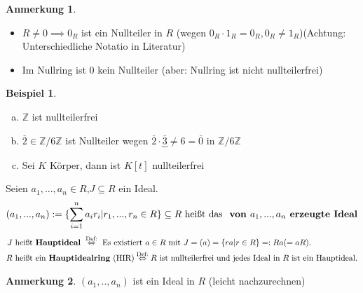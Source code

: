 \documentclass[a4paper, titlepage]{article}
\theoremstyle{definition}
\newtheorem{bsp}[satz]{Beispiel}
\newtheorem*{anm}{Anmerkung}
\newcommand{\Z}{\mathbb{Z}}
\begin{document}
\begin{anm}
\begin{itemize}
	\item $R\neq 0 \implies 0_R$ ist ein Nullteiler in $R$ (wegen $0_R\cdot 1_R=0_R, 0_R\neq 1_R$)(Achtung: Unterschiedliche Notatio in Literatur)
	\item Im Nullring ist $0$ kein Nullteiler (aber: Nullring ist nicht nullteilerfrei)
\end{itemize}
\end{anm}
\begin{bsp}
	\begin{enumerate}[(a)]
		\item $\Z$ ist nullteilerfrei
		\item $\overline{2}\in \Z/6\Z$ ist Nullteiler wegen $\overline{2}\cdot \underbrace{\overline{3}}{\neq 6}= \overline{0}$ in $\Z/6\Z$
		\item Sei $K$ Körper, dann ist $K[t]$ nullteilerfrei
	\end{enumerate}
\end{bsp}
\begin{definition}
Seien $a_1,...,a_n\in R$,$J\subseteq R$ ein Ideal. 
$$	(a_1,...,a_n):=\{\sum_{i=1}^{n}a_ir_i|r_1,...,r_n\in R\} \subseteq R \text{ heißt das \textbf{ von $a_1,...,a_n$ erzeugte Ideal}}$$
\begin{align*}
J& \text{ heißt \textbf{Hauptideal} }\overset{\text{Def:}}{\Leftrightarrow}\text{ Es existiert } a\in R \text{ mit } J=(a)=\{ra|r\in R\} =: Ra (=aR).\\
R&\text{ heißt ein \textbf{Hauptidealring} (HIR)}\overset{\text{Def:}}{\Leftrightarrow}R\text{ ist nullteilerfrei und jedes Ideal in } R \text{ ist ein Hauptideal.}
\end{align*}
\end{definition}
\begin{anm}
 $(a_1,..,a_n)$ ist ein Ideal in $R$ (leicht nachzurechnen)
\end{anm}
\newpage
\end{document}
